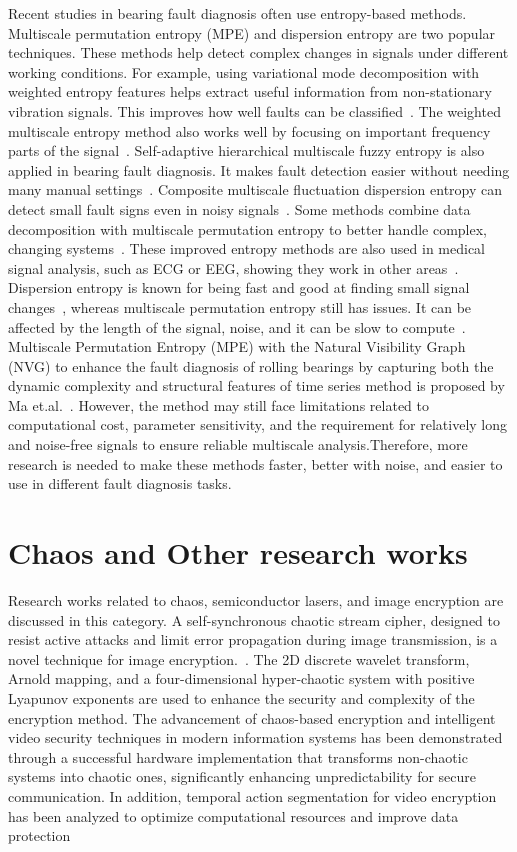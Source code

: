 Recent studies in bearing fault diagnosis often use entropy-based methods. Multiscale permutation entropy (MPE) and dispersion entropy are two popular techniques. These methods help detect complex changes in signals under different working conditions. For example, using variational mode decomposition with weighted entropy features helps extract useful information from non-stationary vibration signals. This improves how well faults can be classified~\cite{Lei2024a}. The weighted multiscale entropy method also works well by focusing on important frequency parts of the signal~\cite{Minhas2021a}. Self-adaptive hierarchical multiscale fuzzy entropy is also applied in bearing fault diagnosis. It makes fault detection easier without needing many manual settings~\cite{Yan2021}.  Composite multiscale fluctuation dispersion entropy can detect small fault signs even in noisy signals~\cite{Gan2019}. Some methods combine data decomposition with multiscale permutation entropy to better handle complex, changing systems~\cite{Yasir2018}. These improved entropy methods are also used in medical signal analysis, such as ECG or EEG, showing they work in other areas~\cite{Azami2017, HumeauHeurtier2015}. Dispersion entropy is known for being fast and good at finding small signal changes~\cite{Rostaghi2019,Rostaghi2016}, whereas multiscale permutation entropy still has issues. It can be affected by the length of the signal, noise, and it can be slow to compute~\cite{HumeauHeurtier2015, Zheng2014c}. Multiscale Permutation Entropy (MPE) with the Natural Visibility Graph (NVG) to enhance the fault diagnosis of rolling bearings by capturing both the dynamic complexity and structural features of time series method is proposed by Ma et.al.~\cite{Ma2025}. However, the method may still face limitations related to computational cost, parameter sensitivity, and the requirement for relatively long and noise-free signals to ensure reliable multiscale analysis.Therefore, more research is needed to make these methods faster, better with noise, and easier to use in different fault diagnosis tasks.

\section{Chaos and Other research works}\label{Sec:ReviewTopicOthers}
Research works related to chaos, semiconductor lasers, and image encryption are discussed in this category. 
A self-synchronous chaotic stream cipher, designed to resist active attacks and limit error propagation during image transmission, is a novel technique for image encryption.~\cite{Fan2018}. The 2D discrete wavelet transform, Arnold mapping, and a four-dimensional hyper-chaotic system with positive Lyapunov exponents are used to enhance the security and complexity of the encryption method. The advancement of chaos-based encryption and intelligent video security techniques in modern information systems has been demonstrated through a successful hardware implementation that transforms non-chaotic systems into chaotic ones, significantly enhancing unpredictability for secure communication. In addition, temporal action segmentation for video encryption has been analyzed to optimize computational resources and improve data protection~\cite{Gao2024,Liu2024k}

